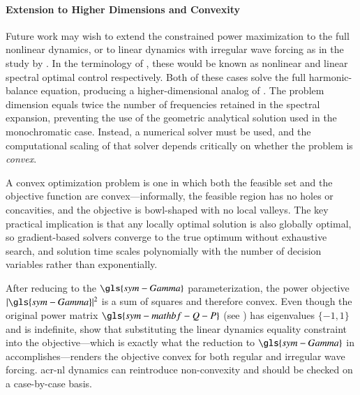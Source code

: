 \paragraph{Extension to Higher Dimensions and Convexity}
\label{sec:appendix-qp-convexity}
Future work may wish to extend the constrained power maximization to the full nonlinear dynamics, or to linear dynamics with irregular wave forcing as in the study by \citet{bacelli_numerical_2015}.
In the terminology of , these would be known as nonlinear and linear spectral optimal control respectively.
Both of these cases solve the full harmonic-balance equation, producing a higher-dimensional analog of .
The problem dimension equals twice the number of frequencies retained in the spectral expansion, preventing the use of the geometric analytical solution used in the monochromatic case.
Instead, a numerical solver must be used, and the computational scaling of that solver depends critically on whether the problem is \emph{convex}.

A convex optimization problem is one in which both the feasible set and the objective function are convex---informally, the feasible region has no holes or concavities, and the objective is bowl-shaped with no local valleys.
The key practical implication is that any locally optimal solution is also globally optimal, so gradient-based solvers converge to the true optimum without exhaustive search, and solution time scales polynomially with the number of decision variables rather than exponentially.

After reducing to the $\gls{sym-Gamma}$ parameterization, the power objective $|\gls{sym-Gamma}|^2$ is a sum of squares and therefore convex.
Even though the original power matrix $\gls{sym-mathbf-Q-P}$ (see ) has eigenvalues $\{-1,1\}$ and is indefinite, \citet{bacelli_numerical_2015} show that substituting the linear dynamics equality constraint into the objective---which is exactly what the reduction to $\gls{sym-Gamma}$ in  accomplishes---renders the objective convex for both regular and irregular wave forcing.
\gls{acr-nl} dynamics can reintroduce non-convexity and should be checked on a case-by-case basis.

